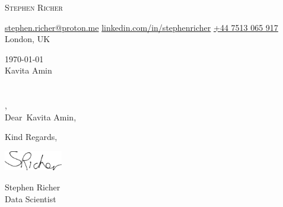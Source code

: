 \documentclass[12pt]{letter}
\makeatletter
\newcommand{\myname}{Stephen Richer}
\newcommand{\mytitle}{Data Scientist}
\newcommand{\myemail}{stephen.richer@proton.me}
\newcommand{\mylinkedin}{stephenricher}
\newcommand{\myphone}{+44 7513 065 917}
\newcommand{\mylocation}{London, UK}
\newcommand{\recipient}{Kavita Amin}
\newcommand{\greeting}{Dear}
\newcommand{\closer}{Kind Regards}
\makeatother
\begin{document}
\begin{center}
{\fontsize{28}{0}\selectfont\scshape \myname}

\href{mailto:\myemail}{\faEnvelope\enspace \myemail}\hfill
\href{https://linkedin.com/in/\mylinkedin}{\faLinkedin\enspace linkedin.com/in/\mylinkedin}\hfill
\href{tel:\myphone}{\faPhone\enspace \myphone}\hfill
\faMapMarker\enspace \mylocation
\end{center}

\vspace{0.2in}

\today\\

\vspace{-0.1in}\recipient\\
\company\\
\street\\
\city, \state\ \zip\\

\vspace{-0.1in}\greeting\ \recipient,\\

\vspace{-0.1in}\setlength\parindent{24pt}
\noindent

\vspace{0.1in}
\vfill

\begin{flushright}
\closer,

\vspace{-0.1in}\includegraphics[width=1in]{signature.png}\vspace{-0.1in}

\myname\\
\mytitle
\end{flushright}

\nocite{*}
\end{document}
